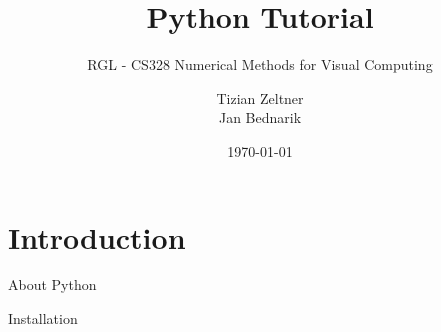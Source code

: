\documentclass[10pt]{beamer}
\title{Python Tutorial}
\subtitle{RGL - CS328 Numerical Methods for Visual Computing}
\date{\today}
\author{Tizian Zeltner\\
Jan Bednarik}
\newcommand\cpp[1]{\cpluspluslogo #1}
\begin{document}
\maketitle


\section{Introduction}


\begin{frame}{About Python}

   

%
%
%
%
%
%
\end{frame}


\begin{frame}{Installation}
%
\end{frame}
\end{document}

